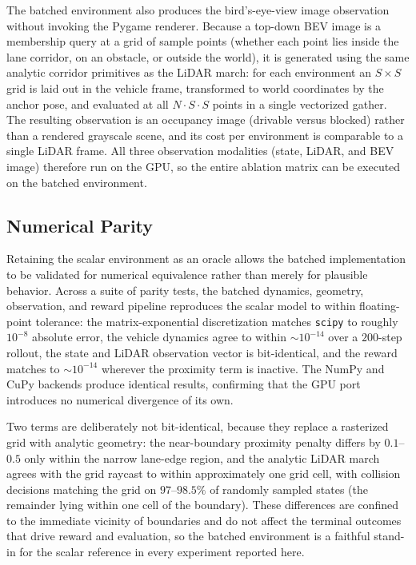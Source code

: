 The batched environment also produces the bird's-eye-view image observation without invoking the Pygame renderer. Because a top-down BEV image is a membership query at a grid of sample points (whether each point lies inside the lane corridor, on an obstacle, or outside the world), it is generated using the same analytic corridor primitives as the LiDAR march: for each environment an $S \times S$ grid is laid out in the vehicle frame, transformed to world coordinates by the anchor pose, and evaluated at all $N \cdot S \cdot S$ points in a single vectorized gather. The resulting observation is an occupancy image (drivable versus blocked) rather than a rendered grayscale scene, and its cost per environment is comparable to a single LiDAR frame. All three observation modalities (state, LiDAR, and BEV image) therefore run on the GPU, so the entire ablation matrix can be executed on the batched environment.

\subsection{Numerical Parity}

Retaining the scalar environment as an oracle allows the batched implementation to be validated for numerical equivalence rather than merely for plausible behavior. Across a suite of parity tests, the batched dynamics, geometry, observation, and reward pipeline reproduces the scalar model to within floating-point tolerance: the matrix-exponential discretization matches \texttt{scipy} to roughly $10^{-8}$ absolute error, the vehicle dynamics agree to within $\sim\!10^{-14}$ over a $200$-step rollout, the state and LiDAR observation vector is bit-identical, and the reward matches to $\sim\!10^{-14}$ wherever the proximity term is inactive. The NumPy and CuPy backends produce identical results, confirming that the GPU port introduces no numerical divergence of its own.

Two terms are deliberately not bit-identical, because they replace a rasterized grid with analytic geometry: the near-boundary proximity penalty differs by $0.1$--$0.5$ only within the narrow lane-edge region, and the analytic LiDAR march agrees with the grid raycast to within approximately one grid cell, with collision decisions matching the grid on $97$--$98.5\%$ of randomly sampled states (the remainder lying within one cell of the boundary). These differences are confined to the immediate vicinity of boundaries and do not affect the terminal outcomes that drive reward and evaluation, so the batched environment is a faithful stand-in for the scalar reference in every experiment reported here.


